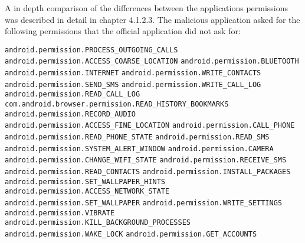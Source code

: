 A in depth comparison of the differences between the applications permissions was described in detail in chapter 4.1.2.3.
\newpage
{}
The malicious application asked for the following permissions that the official application did not ask for:

\texttt{android.permission.PROCESS\_OUTGOING\_CALLS}
\newline \texttt{android.permission.ACCESS\_COARSE\_LOCATION}
\newline \texttt{android.permission.BLUETOOTH}
\newline \texttt{android.permission.INTERNET}
\newline \texttt{android.permission.WRITE\_CONTACTS}
\newline \texttt{android.permission.SEND\_SMS}
\newline \texttt{android.permission.WRITE\_CALL\_LOG}
\newline \texttt{android.permission.READ\_CALL\_LOG}
\newline \texttt{com.android.browser.permission.READ\_HISTORY\_BOOKMARKS}
\newline \texttt{android.permission.RECORD\_AUDIO}
\newline \texttt{android.permission.ACCESS\_FINE\_LOCATION}
\newline \texttt{android.permission.CALL\_PHONE}
\newline \texttt{android.permission.READ\_PHONE\_STATE}
\newline \texttt{android.permission.READ\_SMS}
\newline \texttt{android.permission.SYSTEM\_ALERT\_WINDOW}
\newline \texttt{android.permission.CAMERA}
\newline \texttt{android.permission.CHANGE\_WIFI\_STATE}
\newline \texttt{android.permission.RECEIVE\_SMS}
\newline \texttt{android.permission.READ\_CONTACTS}
\newline \texttt{android.permission.INSTALL\_PACKAGES}
\newline \texttt{android.permission.SET\_WALLPAPER\_HINTS}
\newline \texttt{android.permission.ACCESS\_NETWORK\_STATE}
\newline \texttt{android.permission.SET\_WALLPAPER}
\newline \texttt{android.permission.WRITE\_SETTINGS}
\newline \texttt{android.permission.VIBRATE}
\newline \texttt{android.permission.KILL\_BACKGROUND\_PROCESSES}
\newline \texttt{android.permission.WAKE\_LOCK}
\newline \texttt{android.permission.GET\_ACCOUNTS}

